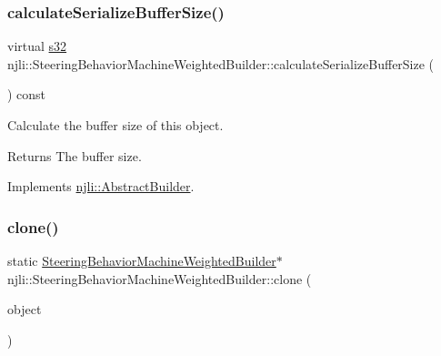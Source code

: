 \mbox{\label{classnjli_1_1_steering_behavior_machine_weighted_builder_a01e0a799f25f332ebcbb642a4d39b9ab}} 
\subsubsection{\texorpdfstring{calculate\+Serialize\+Buffer\+Size()}{calculateSerializeBufferSize()}}
{\footnotesize\ttfamily virtual \mbox{\hyperlink{_util_8h_aa62c75d314a0d1f37f79c4b73b2292e2}{s32}} njli\+::\+Steering\+Behavior\+Machine\+Weighted\+Builder\+::calculate\+Serialize\+Buffer\+Size (\begin{DoxyParamCaption}{ }\end{DoxyParamCaption}) const\hspace{0.3cm}{\ttfamily [virtual]}}

Calculate the buffer size of this object.

\begin{DoxyReturn}{Returns}
The buffer size. 
\end{DoxyReturn}


Implements \mbox{\hyperlink{classnjli_1_1_abstract_builder_aa1d220053e182c37b31b427499c6eacf}{njli\+::\+Abstract\+Builder}}.

\mbox{\label{classnjli_1_1_steering_behavior_machine_weighted_builder_a94bd181b23d367f3f3925f6d3371a315}} 
\subsubsection{\texorpdfstring{clone()}{clone()}}
{\footnotesize\ttfamily static \mbox{\hyperlink{classnjli_1_1_steering_behavior_machine_weighted_builder}{Steering\+Behavior\+Machine\+Weighted\+Builder}}$\ast$ njli\+::\+Steering\+Behavior\+Machine\+Weighted\+Builder\+::clone (\begin{DoxyParamCaption}\item[{const \mbox{\hyperlink{classnjli_1_1_steering_behavior_machine_weighted_builder}{Steering\+Behavior\+Machine\+Weighted\+Builder}} \&}]{object }\end{DoxyParamCaption})\hspace{0.3cm}{\ttfamily [static]}}

